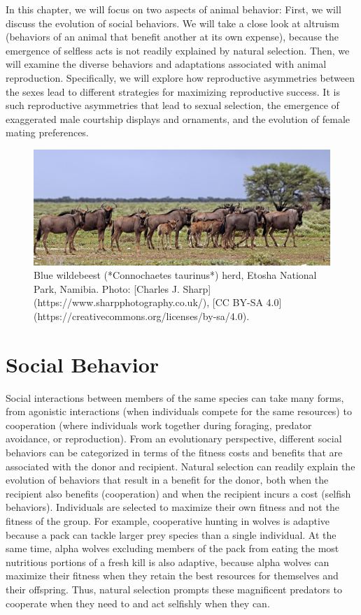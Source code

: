 \documentclass[
]{book}
\begin{document}
In this chapter, we will focus on two aspects of animal behavior: First, we will discuss the evolution of social behaviors. We will take a close look at altruism (behaviors of an animal that benefit another at its own expense), because the emergence of selfless acts is not readily explained by natural selection. Then, we will examine the diverse behaviors and adaptations associated with animal reproduction. Specifically, we will explore how reproductive asymmetries between the sexes lead to different strategies for maximizing reproductive success. It is such reproductive asymmetries that lead to sexual selection, the emergence of exaggerated male courtship displays and ornaments, and the evolution of female mating preferences.

\begin{figure}
\includegraphics[width=1\linewidth]{images/gnu} \caption{Blue wildebeest (*Connochaetes taurinus*) herd, Etosha National Park, Namibia. Photo: [Charles J. Sharp](https://www.sharpphotography.co.uk/), [CC BY-SA 4.0](https://creativecommons.org/licenses/by-sa/4.0).}\label{fig:gnu}
\end{figure}

\hypertarget{social-behavior}{%
\section{Social Behavior}\label{social-behavior}}

Social interactions between members of the same species can take many forms, from agonistic interactions (when individuals compete for the same resources) to cooperation (where individuals work together during foraging, predator avoidance, or reproduction). From an evolutionary perspective, different social behaviors can be categorized in terms of the fitness costs and benefits that are associated with the donor and recipient. Natural selection can readily explain the evolution of behaviors that result in a benefit for the donor, both when the recipient also benefits (cooperation) and when the recipient incurs a cost (selfish behaviors). Individuals are selected to maximize their own fitness and not the fitness of the group. For example, cooperative hunting in wolves is adaptive because a pack can tackle larger prey species than a single individual. At the same time, alpha wolves excluding members of the pack from eating the most nutritious portions of a fresh kill is also adaptive, because alpha wolves can maximize their fitness when they retain the best resources for themselves and their offspring. Thus, natural selection prompts these magnificent predators to cooperate when they need to and act selfishly when they can.
\end{document}
